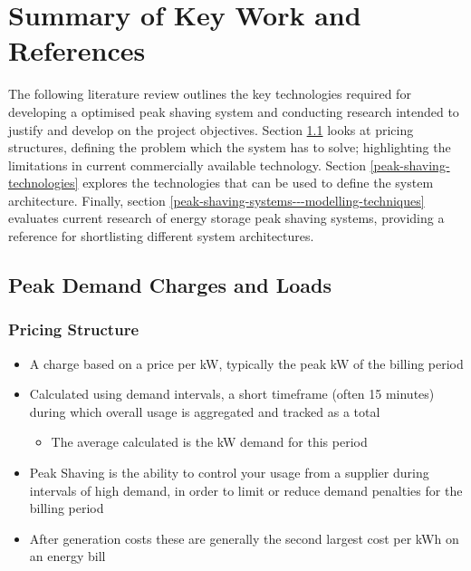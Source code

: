 \newpage

\section{Summary of Key Work and
References}\label{summary-of-key-work-and-references}

The following literature review outlines the key technologies required
for developing a optimised peak shaving system and conducting research
intended to justify and develop on the project objectives. Section
\ref{peak-demand-charges-and-loads} looks at pricing structures,
defining the problem which the system has to solve; highlighting the
limitations in current commercially available technology. Section
\ref{peak-shaving-technologies} explores the technologies that can be
used to define the system architecture. Finally, section
\ref{peak-shaving-systems---modelling-techniques} evaluates current
research of energy storage peak shaving systems, providing a reference
for shortlisting different system architectures.

\subsection{Peak Demand Charges and
Loads}\label{peak-demand-charges-and-loads}

\subsubsection{Pricing Structure}\label{pricing-structure}

\begin{itemize}
\tightlist
\item
  A charge based on a price per kW, typically the peak kW of the billing
  period\cite{schneiderRECPS}
\item
  Calculated using demand intervals, a short timeframe (often 15
  minutes) during which overall usage is aggregated and tracked as a
  total

  \begin{itemize}
  \tightlist
  \item
    The average calculated is the kW demand for this period
  \end{itemize}
\item
  Peak Shaving is the ability to control your usage from a supplier
  during intervals of high demand, in order to limit or reduce demand
  penalties for the billing period
\item
  After generation costs these are generally the second largest cost per
  kWh on an energy bill
\end{itemize}

